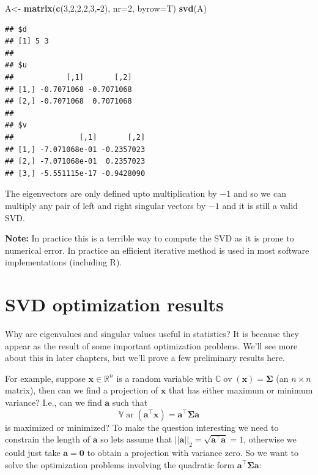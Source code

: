 \documentclass[
]{book}
\newenvironment{Shaded}{\begin{snugshade}}{\end{snugshade}}
\newcommand{\AttributeTok}[1]{\textcolor[rgb]{0.13,0.29,0.53}{#1}}
\newcommand{\DecValTok}[1]{\textcolor[rgb]{0.00,0.00,0.81}{#1}}
\newcommand{\FunctionTok}[1]{\textcolor[rgb]{0.13,0.29,0.53}{\textbf{#1}}}
\newcommand{\NormalTok}[1]{#1}
\newcommand{\OtherTok}[1]{\textcolor[rgb]{0.56,0.35,0.01}{#1}}
\newcommand{\SpecialCharTok}[1]{\textcolor[rgb]{0.81,0.36,0.00}{\textbf{#1}}}
\theoremstyle{definition}
\theoremstyle{definition}
\theoremstyle{definition}
\theoremstyle{definition}
\theoremstyle{remark}
\begin{document}
\begin{Shaded}
\begin{Highlighting}[]
\NormalTok{A}\OtherTok{\textless{}{-}} \FunctionTok{matrix}\NormalTok{(}\FunctionTok{c}\NormalTok{(}\DecValTok{3}\NormalTok{,}\DecValTok{2}\NormalTok{,}\DecValTok{2}\NormalTok{,}\DecValTok{2}\NormalTok{,}\DecValTok{3}\NormalTok{,}\SpecialCharTok{{-}}\DecValTok{2}\NormalTok{), }\AttributeTok{nr=}\DecValTok{2}\NormalTok{, }\AttributeTok{byrow=}\NormalTok{T)}
\FunctionTok{svd}\NormalTok{(A)}
\end{Highlighting}
\end{Shaded}

\begin{verbatim}
## $d
## [1] 5 3
## 
## $u
##            [,1]       [,2]
## [1,] -0.7071068 -0.7071068
## [2,] -0.7071068  0.7071068
## 
## $v
##               [,1]       [,2]
## [1,] -7.071068e-01 -0.2357023
## [2,] -7.071068e-01  0.2357023
## [3,] -5.551115e-17 -0.9428090
\end{verbatim}

The eigenvectors are only defined upto multiplication by \(-1\) and so we can multiply any pair of left and right singular vectors by \(-1\) and it is still a valid SVD.

\textbf{Note:} In practice this is a terrible way to compute the SVD as it is prone to numerical error. In practice an efficient iterative method is used in most software implementations (including R).

\section{SVD optimization results}\label{svdopt}

Why are eigenvalues and singular values useful in statistics? It is because they appear as the result of some important optimization problems. We'll see more about this in later chapters, but we'll prove a few preliminary results here.

For example, suppose \(\mathbf x\in\mathbb{R}^n\) is a random variable with \({\mathbb{C}\operatorname{ov}}(\mathbf x)=\boldsymbol{\Sigma}\) (an \(n \times n\) matrix), then can we find a projection of \(\mathbf x\) that has either maximum or minimum variance? I.e., can we find \(\mathbf a\) such that \[{\mathbb{V}\operatorname{ar}}(\mathbf a^\top\mathbf x)=\mathbf a^\top \boldsymbol{\Sigma}\mathbf a\] is maximized or minimized?
To make the question interesting we need to constrain the length of \(\mathbf a\) so lets assume that \(||\mathbf a||_2 = \sqrt{\mathbf a^\top \mathbf a}=1\), otherwise we could just take \(\mathbf a={\boldsymbol 0}\) to obtain a projection with variance zero. So we want to solve the optimization problems involving the quadratic form \(\mathbf a^\top \boldsymbol{\Sigma}\mathbf a\):
\end{document}
